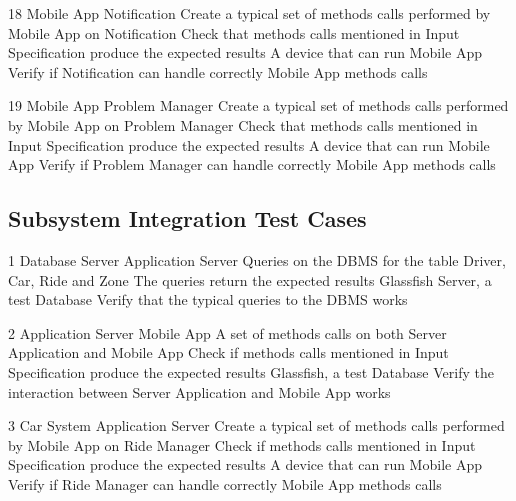 \testCase
	{18}
	{Mobile App}
	{Notification}
	{Create a typical set of methods calls performed by Mobile App on Notification}
	{Check that methods calls mentioned in Input Specification produce the expected results}
	{A device that can run Mobile App}
	{Verify  if Notification can handle correctly Mobile App methods calls}

\testCase
	{19}
	{Mobile App}
	{Problem Manager}
	{Create a typical set of methods calls performed by Mobile App on Problem Manager}
	{Check that methods calls mentioned in Input Specification produce the expected results}
	{A device that can run Mobile App}
	{Verify  if Problem Manager can handle correctly Mobile App methods calls}	
	
\subsection{Subsystem Integration Test Cases}	
\testCaseSub
	{1}
	{Database Server}
	{Application Server}
	{Queries on the DBMS for the table Driver, Car, Ride and Zone}
	{The queries return the expected results}
	{Glassfish Server, a test Database}
	{Verify that the typical queries to the DBMS  works}

\testCaseSub
	{2}
	{Application Server}
	{Mobile App}
	{A set of methods calls on both Server Application and Mobile App }
	{Check if methods calls mentioned in Input Specification produce the expected results}
	{Glassfish, a test Database}
	{Verify the interaction between Server Application and Mobile App works}


	
\testCaseSub
	{3}
	{Car System}
	{Application Server}
	{Create a typical set of methods calls performed by Mobile App on Ride Manager}
	{Check if methods calls mentioned in Input Specification produce the expected results}
	{A device that can run Mobile App}
	{Verify  if Ride Manager can handle correctly Mobile App methods calls}

